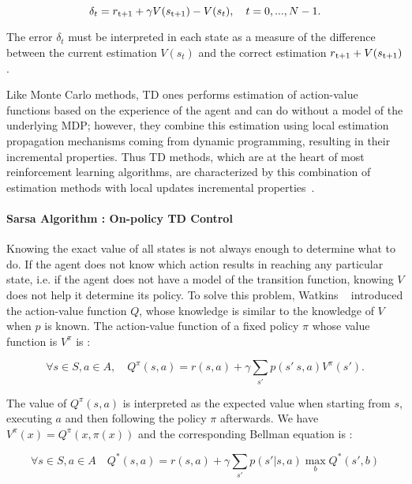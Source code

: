 \begin{equation}
\delta_t = r\textsubscript{t+1} + \gamma V(s\textsubscript{t+1}) - V(s_t), \quad t = 0, ..., N-1.
\end{equation} 

The error $\delta_t$ must be interpreted in each state as a measure of the difference between the current estimation $V(s_t)$ and the correct estimation $r\textsubscript{t+1} + V(s\textsubscript{t+1})$.

Like Monte Carlo methods, TD ones performs estimation of action-value functions based on the experience of the agent and can do without a model of the underlying MDP; however, they combine this estimation using local estimation propagation mechanisms coming from dynamic programming, resulting in their incremental properties. Thus TD methods, which are at the heart of most reinforcement learning algorithms, are characterized by this combination of estimation methods with local updates incremental properties~\cite{Sigaud:2010:MDP:1841781}.

\paragraph{Sarsa Algorithm : On-policy TD Control} Knowing the exact value of all states is not always enough to determine what to do. If the agent does not know which action results in reaching any particular state, i.e. if the agent does not have a model of the transition function, knowing $V$ does not help it determine its policy.  To solve this problem, Watkins ~\cite{watkins1992q} introduced the action-value function $Q$, whose knowledge is similar to the knowledge of $V$ when $p$ is known. The action-value function of a fixed policy $\pi$ whose value function is $V^\pi$ is :

\begin{equation}
	\forall s \in S, a \in A, \quad Q^\pi (s,a) = r(s, a) + \gamma \sum_{s'} p(s' \ s, a) V^\pi (s').
\end{equation}

The value of $Q^\pi(s,a)$ is interpreted as the expected value when starting from $s$, executing $a$ and then following the policy $\pi$ afterwards. We have $V^\pi(x) = Q^\pi(x, \pi(x))$ and the corresponding Bellman equation is :

\begin{equation}
	\forall s \in S, a \in A \quad Q^*(s, a) = r(s, a) + \gamma \sum_{s'}p(s' | s, a) \max_{b} Q^*(s', b)
\end{equation}

